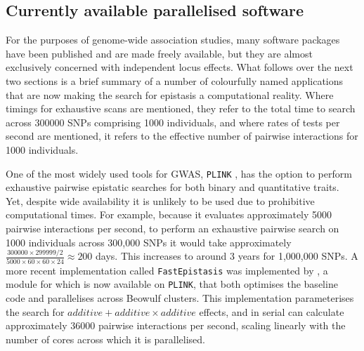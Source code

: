 \subsection{Currently available parallelised software}

For the purposes of genome-wide association studies, many software packages have been published and are made freely available, but they are almost exclusively concerned with independent locus effects. What follows over the next two sections is a brief summary of a number of colourfully named applications that are now making the search for epistasis a computational reality. Where timings for exhaustive scans are mentioned, they refer to the total time to search across 300000 SNPs comprising 1000 individuals, and where rates of tests per second are mentioned, it refers to the effective number of pairwise interactions for 1000 individuals.

One of the most widely used tools for GWAS, {\tt PLINK} \citep{Purcell2007}, has the option to perform exhaustive pairwise epistatic searches for both binary and quantitative traits. Yet, despite wide availability it is unlikely to be used due to prohibitive computational times. For example, because it evaluates approximately 5000 pairwise interactions per second, to perform an exhaustive pairwise search on 1000 individuals across 300,000 SNPs it would take approximately $\frac{300000 \times 299999 / 2}{5000 \times 60 \times 60 \times 24} \approx 200$ days. This increases to around 3 years for 1,000,000 SNPs. A more recent implementation called {\tt FastEpistasis} was implemented by \cite{Schupbach2010}, a module for which is now available on {\tt PLINK}, that both optimises the baseline code and parallelises across Beowulf clusters. This implementation parameterises the search for $additive + additive \times additive$ effects, and in serial can calculate approximately 36000 pairwise interactions per second, scaling linearly with the number of cores across which it is parallelised.

